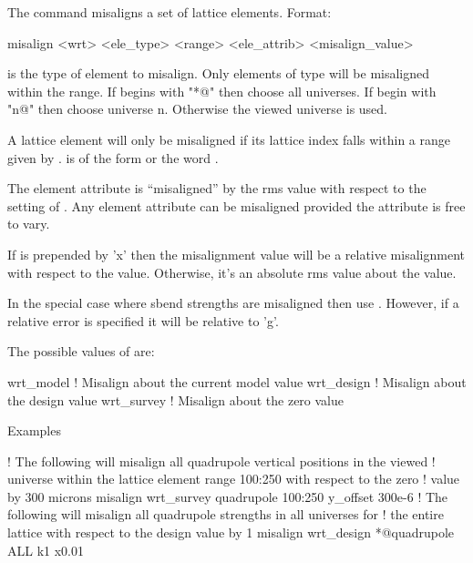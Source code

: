 The  command misaligns a set of lattice elements. Format:
\begin{example}
   misalign <wrt> <ele_type> <range> <ele_attrib> <misalign_value>
\end{example}

\vskip 0.2in 

 is the type of element to misalign.  Only
elements of type  will be misaligned within the range.
If  begins with "*@" then choose all universes. If
 begin with "n@" then choose universe n. Otherwise the
viewed universe is used.

A lattice element will only be misaligned if its lattice index falls within
a range given by .  is of the form
 or the word . 

The element attribute  is ``misaligned'' by the rms
value  with respect to the setting of
. Any element attribute can be misaligned provided the
attribute is free to vary.

If  is prepended by 'x' then the misalignment value will be
a relative misalignment with respect to the  value. Otherwise, it's an 
absolute rms value about the  value.

In the special case where sbend strengths are misaligned then use
. However, if a relative error is specified it will be 
relative to 'g'.

The possible values of  are:
\begin{example}
  wrt_model          ! Misalign about the current model value
  wrt_design         ! Misalign about the design value
  wrt_survey         ! Misalign about the zero value
\end{example}

Examples
\begin{example}
   ! The following will misalign all quadrupole vertical positions in the viewed
   ! universe within the lattice element range 100:250 with respect to the zero 
   ! value by 300 microns
  misalign wrt_survey quadrupole 100:250 y_offset 300e-6
   ! The following will misalign all quadrupole strengths in all universes for
   ! the entire lattice with respect to the design value by 1%
  misalign wrt_design *@quadrupole ALL k1 x0.01
\end{example}

